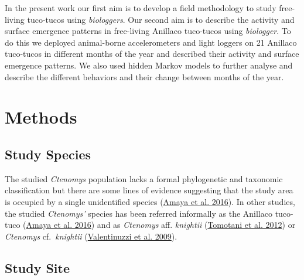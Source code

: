 \documentclass[msc,numbers,hidelinks]{coppe}
\begin{document}
  In the present work our first aim is to develop a field methodology to study free-living tuco-tucos using \emph{biologgers}. Our second aim is to describe the activity and surface emergence patterns in free-living Anillaco tuco-tucos using \emph{biologger}. To do this we deployed animal-borne accelerometers and light loggers on 21 Anillaco tuco-tucos in different months of the year and described their activity and surface emergence patterns. We also used hidden Markov models to further analyse and describe the different behaviors and their change between months of the year.

  \hypertarget{methods}{%
  \section{Methods}\label{methods}}

  \hypertarget{study-species}{%
  \subsection{Study Species}\label{study-species}}

  The studied \emph{Ctenomys} population lacks a formal phylogenetic and taxonomic classification but there are some lines of evidence suggesting that the study area is occupied by a single unidentified species (\protect\hyperlink{ref-amaya2016}{Amaya et al. 2016}). In other studies, the studied \emph{Ctenomys'} species has been referred informally as the Anillaco tuco-tuco (\protect\hyperlink{ref-amaya2016}{Amaya et al. 2016}) and as \emph{Ctenomys} aff. \emph{knightii} (\protect\hyperlink{ref-tomotani2012}{Tomotani et al. 2012}) or \emph{Ctenomys} cf.~\emph{knightii} (\protect\hyperlink{ref-valentinuzzi2009}{Valentinuzzi et al. 2009}).

  \hypertarget{study-site}{%
  \subsection{Study Site}\label{study-site}}
\end{document}
